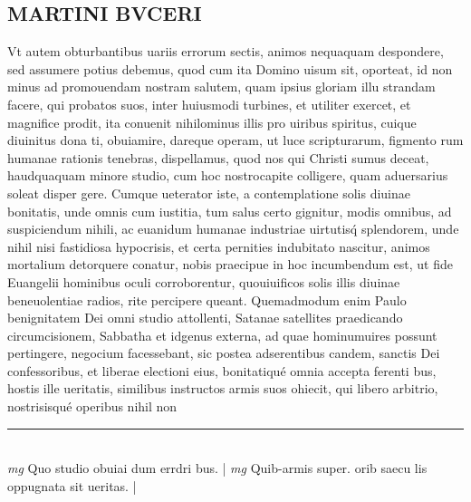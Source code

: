 \documentclass{article}
\begin{document}
\begin{pages}
\section*{MARTINI BVCERI }\pstart Vt autem obturbantibus   uariis errorum sectis, animos nequaquam despondere, sed assumere potius debemus, quod cum ita Domino uisum sit, oporteat, id non minus ad promouendam nostram salutem, quam ipsius gloriam illu strandam facere, qui probatos suos, inter huiusmodi turbines, et utiliter exercet, et magnifice prodit, ita conuenit nihilominus illis pro uiribus spiritus, cuique diuinitus dona ti, obuiamire, dareque operam, ut luce scripturarum, figmento rum humanae rationis tenebras, dispellamus, quod nos qui Christi sumus deceat, haudquaquam minore studio, cum hoc nostrocapite colligere, quam aduersarius soleat disper gere. Cumque ueterator iste, a contemplatione solis diuinae bonitatis, unde omnis cum iustitia, tum salus certo gignitur, modis omnibus, ad suspiciendum nihili, ac euanidum humanae industriae uirtutisq́ splendorem, unde nihil nisi fastidiosa hypocrisis, et certa pernities indubitato nascitur, animos mortalium detorquere conatur, nobis praecipue in hoc incumbendum est, ut fide Euangelii hominibus oculi corroborentur, quouiuificos solis illis diuinae beneuolentiae radios, rite percipere queant.  \pend\pstart Quemadmodum enim Paulo benignitatem Dei omni studio attollenti, Satanae satellites praedicando circumcisionem, Sabbatha et idgenus externa, ad quae hominumuires possunt pertingere, negocium facessebant, sic postea adserentibus candem, sanctis Dei confessoribus, et liberae electioni eius, bonitatiqué omnia accepta ferenti bus, hostis ille ueritatis, similibus instructos armis suos ohiecit, qui libero arbitrio, nostrisisqué operibus nihil non  \pend
\vspace{0.5cm}\noindent
\vspace{0.2cm}\rule{1cm}{0.2pt}\\ 
\hspace{0.2cm}\textit{mg}
\footnotesize Quo studio obuiai dum errdri bus. 
\normalsize| 
\hspace{0.2cm}\textit{mg}
\footnotesize Quib-armis super. orib saecu lis oppugnata sit ueritas. 
\normalsize| 

\end{pages}
\end{document}
